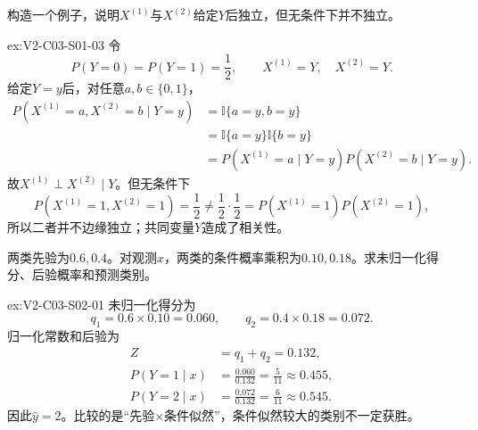 \begin{SLChapterExercisePairSection}
\begin{exercise}\label{ex:V2-C03-S01-03}
构造一个例子，说明$X^{(1)}$与$X^{(2)}$给定$Y$后独立，但无条件下并不独立。
\end{exercise}
\ifSLFullEdition
{}\label{sol:V2-C03-S01-03}
\begin{chapterexercisesolution}{ex:V2-C03-S01-03}
令
\[
P(Y=0)=P(Y=1)=\frac12,
\qquad
X^{(1)}=Y,\quad X^{(2)}=Y.
\]
给定$Y=y$后，对任意$a,b\in\{0,1\}$，
\[
\begin{aligned}
P(X^{(1)}=a,X^{(2)}=b\mid Y=y)
&=\mathbb I\{a=y,b=y\}\\
&=\mathbb I\{a=y\}\mathbb I\{b=y\}\\
&=P(X^{(1)}=a\mid Y=y)P(X^{(2)}=b\mid Y=y).
\end{aligned}
\]
故$X^{(1)}\perp X^{(2)}\mid Y$。但无条件下
\[
P(X^{(1)}=1,X^{(2)}=1)=\frac12
\neq
\frac12\cdot\frac12
=P(X^{(1)}=1)P(X^{(2)}=1),
\]
所以二者并不边缘独立；共同变量$Y$造成了相关性。
\end{chapterexercisesolution}
\fi

\begin{exercise}\label{ex:V2-C03-S02-01}
两类先验为$0.6,0.4$。对观测$x$，两类的条件概率乘积为$0.10,0.18$。求未归一化得分、后验概率和预测类别。
\end{exercise}
\ifSLFullEdition
{}\label{sol:V2-C03-S02-01}
\begin{chapterexercisesolution}{ex:V2-C03-S02-01}
未归一化得分为
\[
q_1=0.6\times0.10=0.060,
\qquad
q_2=0.4\times0.18=0.072.
\]
归一化常数和后验为
\[
\begin{aligned}
Z&=q_1+q_2=0.132,\\
P(Y=1\mid x)&=\frac{0.060}{0.132}=\frac5{11}\approx0.455,\\
P(Y=2\mid x)&=\frac{0.072}{0.132}=\frac6{11}\approx0.545.
\end{aligned}
\]
因此$\widehat y=2$。比较的是“先验$\times$条件似然”，条件似然较大的类别不一定获胜。
\end{chapterexercisesolution}
\fi


\end{SLChapterExercisePairSection}
